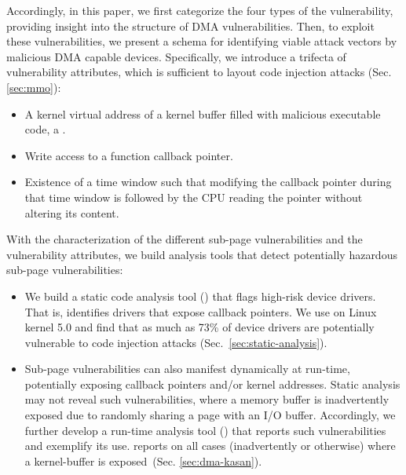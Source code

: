 Accordingly, in this paper, we first categorize the four types of the \subpage{} vulnerability, providing insight into the structure of DMA vulnerabilities.
Then, to exploit these vulnerabilities, we present a schema for identifying viable attack vectors by malicious DMA capable devices. Specifically, we introduce a trifecta of vulnerability attributes, which is sufficient to layout code injection attacks (Sec. \ref{sec:mmo}):

\begin{itemize}
    \item A kernel virtual address of a kernel buffer filled with malicious executable code, a \mabaf.
    \item Write access to a function callback pointer.
    \item Existence of a time window such that modifying the callback pointer during that time window is followed by the CPU reading the pointer without altering its content. 
\end{itemize} 

With the characterization of the different sub-page vulnerabilities and the vulnerability attributes, we build analysis tools that detect potentially hazardous sub-page vulnerabilities:

\begin{itemize}
    \item We build a static code analysis tool (\tool)  that flags high-risk device drivers. That is, \tool identifies drivers that expose callback pointers.
We use \tool on Linux kernel 5.0 and find that as much as 73\% of device drivers are potentially vulnerable to code injection attacks (Sec.~\ref{sec:static-analysis}). 

    \item Sub-page vulnerabilities can also manifest dynamically at run-time, potentially exposing callback pointers and/or kernel addresses. 
Static analysis may not reveal such vulnerabilities, where a memory buffer is inadvertently exposed due to randomly sharing a page with an I/O buffer. Accordingly, we further develop a run-time analysis tool (\dkasan) that reports such vulnerabilities and exemplify its use. \dkasan reports on all cases (inadvertently or otherwise) where a kernel-buffer is exposed~(Sec. \ref{sec:dma-kasan}).
\end{itemize}


